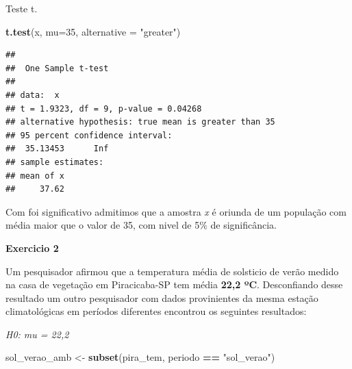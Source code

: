 \documentclass[
]{book}
\newenvironment{Shaded}{\begin{snugshade}}{\end{snugshade}}
\newcommand{\DataTypeTok}[1]{\textcolor[rgb]{0.13,0.29,0.53}{#1}}
\newcommand{\DecValTok}[1]{\textcolor[rgb]{0.00,0.00,0.81}{#1}}
\newcommand{\KeywordTok}[1]{\textcolor[rgb]{0.13,0.29,0.53}{\textbf{#1}}}
\newcommand{\NormalTok}[1]{#1}
\newcommand{\OperatorTok}[1]{\textcolor[rgb]{0.81,0.36,0.00}{\textbf{#1}}}
\newcommand{\StringTok}[1]{\textcolor[rgb]{0.31,0.60,0.02}{#1}}
\begin{document}
Teste t.

\begin{Shaded}
\begin{Highlighting}[]
\KeywordTok{t.test}\NormalTok{(x,}
       \DataTypeTok{mu=}\DecValTok{35}\NormalTok{,}
       \DataTypeTok{alternative =} \StringTok{"greater"}\NormalTok{)}
\end{Highlighting}
\end{Shaded}

\begin{verbatim}
## 
##  One Sample t-test
## 
## data:  x
## t = 1.9323, df = 9, p-value = 0.04268
## alternative hypothesis: true mean is greater than 35
## 95 percent confidence interval:
##  35.13453      Inf
## sample estimates:
## mean of x 
##     37.62
\end{verbatim}

Com foi significativo admitimos que a amostra \emph{x} é oriunda de um população com média maior que o valor de 35, com nivel de 5\% de significância.

\textbf{Exercicio 2}

Um pesquisador afirmou que a temperatura média de solsticio de verão medido na casa de vegetação em Piracicaba-SP tem média \textbf{22,2 ºC}.
Desconfiando desse resultado um outro pesquisador com dados provinientes da mesma estação climatológicas em períodos diferentes encontrou os seguintes resultados:

\emph{H0: mu = 22,2}

\begin{Shaded}
\begin{Highlighting}[]
\NormalTok{  sol_verao_amb <-}\StringTok{ }\KeywordTok{subset}\NormalTok{(pira_tem, periodo }\OperatorTok{==}\StringTok{ "sol_verao"}\NormalTok{)}
\end{Highlighting}
\end{Shaded}

\begin{Shaded}
\end{Shaded}
\end{document}
